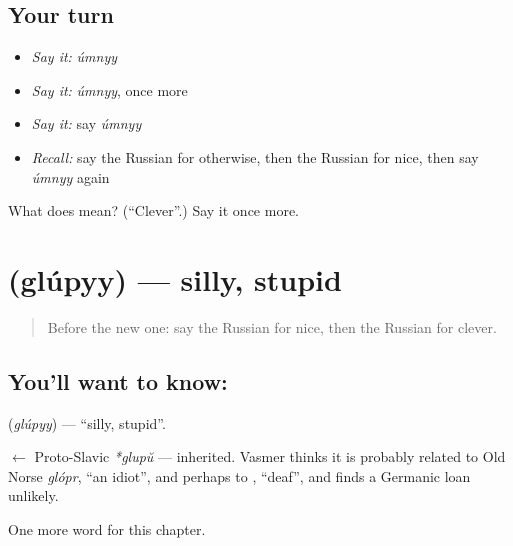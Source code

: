 \subsection*{Your turn}
\begin{itemize}
\raggedright
  \item \emph{Say it:} \emph{úmnyy}
  \item \emph{Say it:} \emph{úmnyy}, once more
  \item \emph{Say it:} say \emph{úmnyy}
  \item \emph{Recall:} say the Russian for otherwise, then the Russian for nice, then say \emph{úmnyy} again
\end{itemize}

\begin{tcolorbox}[breakable,colback=teal!4,colframe=teal!35!black,title={Before you move on}]
What does  mean? (\textquotedblleft{}Clever\textquotedblright{}.) Say it once more.
\end{tcolorbox}
\section[\texorpdfstring{\ru{глупый} (glúpyy)}{глупый (glúpyy)}]{ (glúpyy) — silly, stupid}

\label{lesson:RU-C155-glupyy}



\begin{quote}
Before the new one: say the Russian for nice, then the Russian for clever.
\end{quote}

\subsection*{You'll want to know: }
\textbf{} (\emph{glúpyy}) — \textquotedblleft{}silly, stupid\textquotedblright{}.

\begin{cousinweb}
\textbf{} $\leftarrow$ Proto-Slavic \emph{*glupŭ} — inherited. Vasmer thinks it is probably related to Old Norse \emph{glópr}, \textquotedblleft{}an idiot\textquotedblright{}, and perhaps to \emph{}, \textquotedblleft{}deaf\textquotedblright{}, and finds a Germanic loan unlikely.
\end{cousinweb}

\begin{grammarlens}[title={What you've built}]
One more word for this chapter.
\end{grammarlens}

